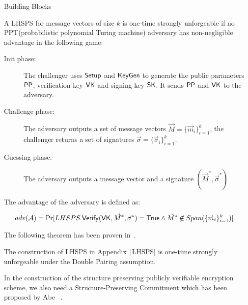 \begin{subsection}{Building Blocks}
  \begin{myDef} A LHSPS for message vectors of size $k$ is one-time strongly unforgeable if no PPT(probabilistic polynomial Turing machine) adversary has non-negligible advantage in the following game:
    \begin{description}
    \item[Init phase: ]The challenger uses ${\mathsf{Setup}}$ and ${\mathsf{KeyGen}}$ to generate the public parameters $\mathsf{PP}$, verification key $\mathsf{VK}$ and signing key $\mathsf{SK}$. It sends $\mathsf{PP}$ and $\mathsf{VK}$ to the adversary.
    \item[Challenge phase: ] The adversary outputs a set of message vectors $\vec{M} = \{\vec{m}_i\}_{i=1}^k$, the challenger returns a set of signatures $\vec{\sigma} = \{\vec{\sigma}_i\}_{i = 1}^k$.
    \item[Guessing phase: ] The adversary outputs a message vector and a signature $(\vec{M}^*, \vec{\sigma}^*)$
    \end{description}
    
    
    The advantage of the adversary is defined as:
    
    \begin{align*}
      adv(\mathcal{A}) &= \operatorname{Pr}[LHSPS.{\mathsf{Verify}}(\mathsf{VK}, \vec{M}^* , \vec{\sigma}^*) = \mathsf{True} \wedge \vec{M}^* \not \in Span(\{\vec{m}_i\}_{i=1}^k)]
    \end{align*}

  \end{myDef}

  The following theorem has been proven in~\cite{DBLP:journals/dcc/LibertPJY15}.
  
  \begin{myTh}
    The construction of LHSPS in Appendix~\ref{LHSPS} is one-time strongly unforgeable under the Double Pairing assumption.
  \end{myTh}
  














  In the construction of the structure preserving publicly verifiable encryption scheme, we also need a Structure-Preserving Commitment which has been proposed by Abe \etal~\cite{DBLP:conf/eurocrypt/AbeKOT15}.


\end{subsection}
